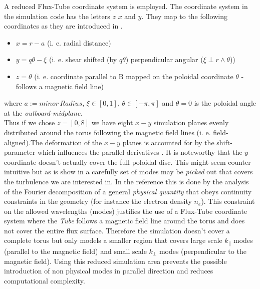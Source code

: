 \documentclass[master.tex]{subfiles}
\begin{document}
A reduced Flux-Tube coordinate system is employed.
The coordinate system in the simulation code has the letters $z$ $x$ and $y$. They map to the following coordinates as they are introduced in \cite{doi:10.1063/1.1335832}.
\begin{itemize}
    \item $x = r - a$   (i. e. radial distance)
    \item $y = q\theta - \xi$ (i. e. shear shifted (by $q\theta$) perpendicular angular ($\xi \perp r \land \theta$))
    \item $z = \theta$ (i. e. coordinate parallel to $\mathrm{B}$ mapped on the poloidal coordinate $\theta$ - follows a magnetic field line)
\end{itemize} 
where $a:=minor\, Radius$, $\xi \in [0,1]$, $\theta \in [-\pi,\pi]$ and $\theta = 0$ is the poloidal angle at the \textit{outboard-midplane}.\\
Thus if we chose $z=[0,8]$ we have eight $x-y$ simulation planes evenly distributed around the torus following the magnetic field lines (i. e. field-aligned).The deformation of the $x-y$ planes is accounted for by the shift-parameter which influences the parallel derivatives \cite{ScootShiftedMetric}.\newline
It is noteworthy that the $y$ coordinate doesn't actually cover the full poloidal disc. This might seem counter intuitive but as is show in \cite{ScottFluxTube} a carefully set of modes may be \textit{picked} out that covers the turbulence we are interested in. In the reference this is done by the analysis of the Fourier decomposition of a general \textit{physical quantity} that obeys continuity constraints in the geometry (for instance the electron density $n_e$).
This constraint on the allowed wavelengths (modes) justifies the use of a Flux-Tube coordinate system where the \textit{Tube} follows a magnetic field line around the torus and does not cover the entire flux surface. Therefore the simulation doesn't cover a complete torus but only models a smaller region that covers large scale $k_\parallel$ modes (parallel to the magnetic field) and small scale $k_\perp$ modes (perpendicular to the magnetic field). Using this reduced simulation area prevents the possible introduction of non physical modes in parallel direction and reduces computational complexity.
\end{document}

